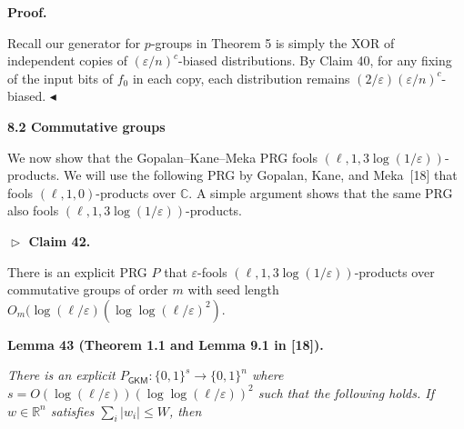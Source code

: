 \documentclass[10pt,a4paper]{article}
\begin{document}




\par\medskip\noindent\textbf{Proof.}\par




Recall our generator for $p$-groups in Theorem 5 is simply the XOR of independent copies of $(\varepsilon/n)^{c}$-biased distributions.
By Claim 40, for any fixing of the input bits of $f_{0}$ in each copy, each distribution remains $(2/\varepsilon)(\varepsilon/n)^{c}$-biased.
$\blacktriangleleft$\par






\par\medskip\noindent\textbf{
8.2 Commutative groups}\par




We now show that the Gopalan–Kane–Meka PRG fools $(\ell,1,3\log(1/\varepsilon))$-products.
We will use the following PRG by Gopalan, Kane, and Meka [18] that fools $(\ell,1,0)$-products over $\mathbb{C}$.
A simple argument shows that the same PRG also fools $(\ell,1,3\log(1/\varepsilon))$-products.\par





\par\medskip\noindent\textbf{
$\vartriangleright$ Claim 42. }\par



There is an explicit PRG $P$ that $\varepsilon$-fools $(\ell,1,3\log(1/\varepsilon))$-products over commutative groups of order $m$ with seed length $O_{m}(\log(\ell/\varepsilon)(\log\log(\ell/\varepsilon)^{2})$.\par







\par\medskip\noindent\textbf{
\textbf{Lemma 43}\textbf{ }(Theorem 1.1 and Lemma 9.1 in [18])\textbf{.}
}\par



\emph{There is an explicit $P_{\mathsf{GKM}}\colon\{0,1\}^{s}\to\{0,1\}^{n}$ where $s=O(\log(\ell/\varepsilon))(\log\log(\ell/\varepsilon))^{2}$ such that the following holds.
If $w\in\mathbb{R}^{n}$ satisfies $\sum_{i}\lvert w_{i}\rvert\leq W$, then}\par
\end{document}

